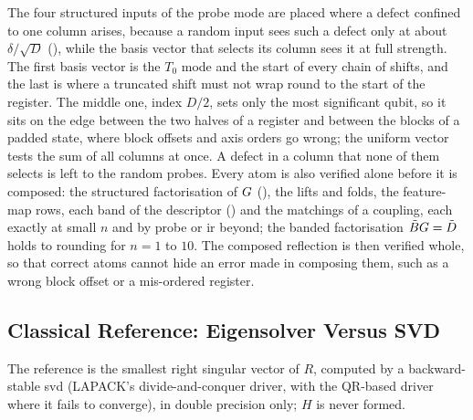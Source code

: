 The four structured inputs of the probe mode are placed where a defect confined to one column arises, because a random input sees such a defect only at about $\delta/\sqrt D$ (), while the basis vector that selects its column sees it at full strength. The first basis vector is the $T_0$ mode and the start of every chain of shifts, and the last is where a truncated shift must not wrap round to the start of the register. The middle one, index $D/2$, sets only the most significant qubit, so it sits on the edge between the two halves of a register and between the blocks of a padded state, where block offsets and axis orders go wrong; the uniform vector tests the sum of all columns at once. A defect in a column that none of them selects is left to the random probes. Every atom is also verified alone before it is composed: the structured factorisation of $G$ (), the lifts and folds, the feature-map rows, each band of the descriptor () and the matchings of a coupling, each exactly at small $n$ and by probe or \gls{ir} beyond; the banded factorisation $\tilde{B}G=\tilde{D}$ holds to rounding for $n=1$ to $10$. The composed reflection is then verified whole, so that correct atoms cannot hide an error made in composing them, such as a wrong block offset or a mis-ordered register.

\subsection{Classical Reference: Eigensolver Versus SVD}
\label{app:eigh-vs-svd}

The reference is the smallest right singular vector of $R$, computed by a backward-stable \gls{svd} (LAPACK's divide-and-conquer driver, with the QR-based driver where it fails to converge), in double precision only; $H$ is never formed.

